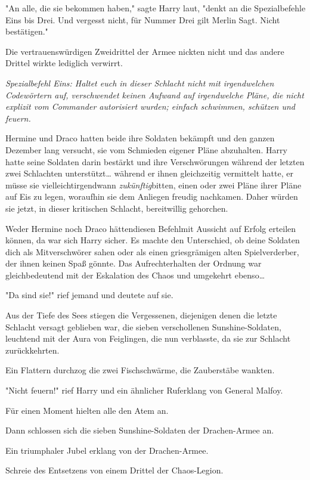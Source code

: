 {"An alle, die sie bekommen haben," sagte Harry laut, "denkt an die Spezialbefehle Eins bis Drei. Und vergesst nicht, für Nummer Drei gilt Merlin Sagt. Nicht bestätigen."

Die vertrauenswürdigen Zweidrittel der Armee nickten nicht und das andere Drittel wirkte lediglich verwirrt.

\emph{Spezialbefehl Eins: Haltet euch in dieser Schlacht nicht mit irgendwelchen Codewörtern auf, verschwendet keinen Aufwand auf irgendwelche Pläne, die nicht explizit vom Commander autorisiert wurden; einfach schwimmen, schützen und feuern.}

Hermine und Draco hatten beide ihre Soldaten bekämpft und den ganzen Dezember lang versucht, sie vom Schmieden eigener Pläne abzuhalten. Harry hatte seine Soldaten darin bestärkt und ihre Verschwörungen während der letzten zwei Schlachten unterstützt… während er ihnen gleichzeitig vermittelt hatte, er müsse sie vielleichtirgendwann \emph{zukünftig}bitten, einen oder zwei Pläne ihrer Pläne auf Eis zu legen, woraufhin sie dem Anliegen freudig nachkamen. Daher würden sie jetzt, in dieser kritischen Schlacht, bereitwillig gehorchen.

Weder Hermine noch Draco hättendiesen Befehlmit Aussicht auf Erfolg erteilen können, da war sich Harry sicher. Es machte den Unterschied, ob deine Soldaten dich als Mitverschwörer sahen oder als einen griesgrämigen alten Spielverderber, der ihnen keinen Spaß gönnte. Das Aufrechterhalten der Ordnung war gleichbedeutend mit der Eskalation des Chaos und umgekehrt ebenso…

"Da sind sie!" rief jemand und deutete auf sie.

Aus der Tiefe des Sees stiegen die Vergessenen, diejenigen denen die letzte Schlacht versagt geblieben war, die sieben verschollenen Sunshine-Soldaten, leuchtend mit der Aura von Feiglingen, die nun verblasste, da sie zur Schlacht zurückkehrten.

Ein Flattern durchzog die zwei Fischschwärme, die Zauberstäbe wankten.

"Nicht feuern!" rief Harry und ein ähnlicher Ruferklang von General Malfoy.

Für einen Moment hielten alle den Atem an.

Dann schlossen sich die sieben Sunshine-Soldaten der Drachen-Armee an.

Ein triumphaler Jubel erklang von der Drachen-Armee.

Schreie des Entsetzens von einem Drittel der Chaos-Legion.

}
